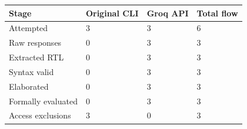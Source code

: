 \begin{tabular}{llll}
\toprule
Stage & Original CLI & Groq API & Total flow \\
\midrule
Attempted & 3 & 3 & 6 \\
Raw responses & 0 & 3 & 3 \\
Extracted RTL & 0 & 3 & 3 \\
Syntax valid & 0 & 3 & 3 \\
Elaborated & 0 & 3 & 3 \\
Formally evaluated & 0 & 3 & 3 \\
Access exclusions & 3 & 0 & 3 \\
\bottomrule
\end{tabular}
